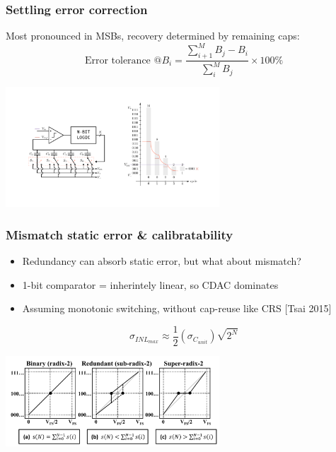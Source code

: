 \documentclass[aspectratio=169]{beamer}
\begin{document}
\begin{frame}
\frametitle{Settling error correction}
Most pronounced in MSBs, recovery determined by remaining caps:
\begin{equation*}
\textrm{Error tolerance @} B_i = \frac{\sum_{i+1}^{M}B_j - B_i} {\sum_{i}^{M}B_j} \times 100 \%
\end{equation*}
\begin{center}
\includegraphics[width=0.6\textwidth]{tranchar2.pdf}
\end{center}
\end{frame}

\begin{frame}
\frametitle{Mismatch static error \& calibratability}
\begin{itemize}
  \item Redundancy can absorb static error, but what about mismatch?
  \item 1-bit comparator = inherintely linear, so CDAC dominates
  \item Assuming monotonic switching, without cap-reuse like CRS [Tsai 2015]
\end{itemize}
\begin{equation*}
\sigma_{INL_{max}} \approx \frac{1}{2}(\sigma_{C_{unit}})\sqrt{2^N}
\end{equation*}
  \begin{center}
  \includegraphics[width=0.6\textwidth]{calibrate.png}
  \end{center}
\end{frame}
\end{document}

